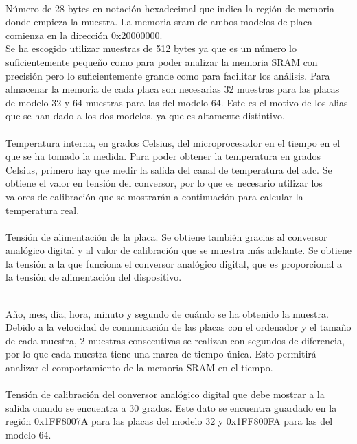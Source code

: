 \documentclass[spanish]{template/minim}
\newcommand{\dataelem}[1]{
    \noindent\textit{{\color{accent}{#1}}}
}
\begin{document}
\dataelem{Región de memoria}\\
Número de 28 bytes en notación hexadecimal que indica la región de memoria donde empieza la muestra. La memoria \gls{sram} de ambos modelos de placa comienza en la dirección {\color{Red}0x20000000}.\\

Se ha escogido utilizar muestras de 512 bytes ya que es un número lo suficientemente pequeño como para poder analizar la memoria SRAM con precisión pero lo suficientemente grande como para facilitar los análisis. Para almacenar la memoria de cada placa son necesarias 32 muestras para las placas de modelo 32 y 64 muestras para las del modelo 64. Este es el motivo de los alias que se han dado a los dos modelos, ya que es altamente distintivo.\\

\dataelem{Temperatura}\\
Temperatura interna, en grados Celsius, del microprocesador en el tiempo en el que se ha tomado la medida. Para poder obtener la temperatura en grados Celsius, primero hay que medir la salida del canal de temperatura del \gls{adc}. Se obtiene el valor en tensión del conversor, por lo que es necesario utilizar los valores de calibración que se mostrarán a continuación para calcular la temperatura real.\\

\dataelem{Vdd}\\
Tensión de alimentación de la placa. Se obtiene también gracias al conversor analógico digital y al valor de calibración que se muestra más adelante. Se obtiene la tensión a la que funciona el conversor analógico digital, que es proporcional a la tensión de alimentación del dispositivo.

\dataelem{Marca de tiempo}\\
Año, mes, día, hora, minuto y segundo de cuándo se ha obtenido la muestra. Debido a la velocidad de comunicación de las placas con el ordenador y el tamaño de cada muestra, 2 muestras consecutivas se realizan con segundos de diferencia, por lo que cada muestra tiene una marca de tiempo única. Esto permitirá analizar el comportamiento de la memoria SRAM en el tiempo.\\

\dataelem{Tensión de calibración a 30 grados}\\
Tensión de calibración del conversor analógico digital que debe mostrar a la salida cuando se encuentra a 30 grados. Este dato se encuentra guardado en la región {\color{accent}0x1FF8007A} para las placas del modelo 32 y {\color{accent}0x1FF800FA} para las del modelo 64.\\
\end{document}
